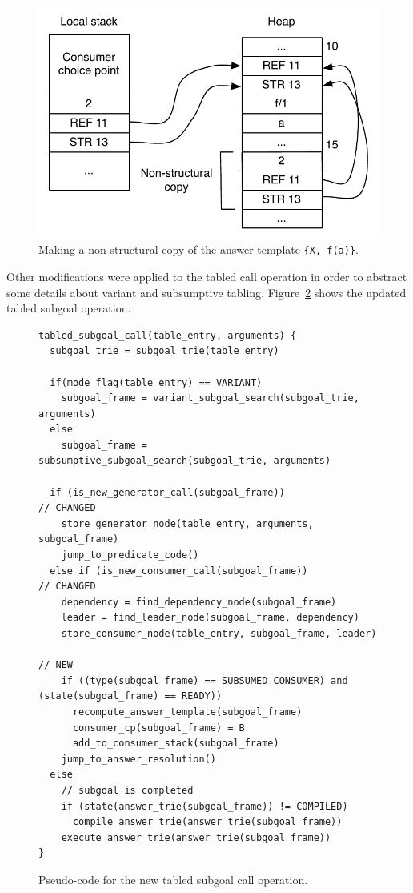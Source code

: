 \begin{figure}[H]
  \centering
    \includegraphics[scale=0.6]{non_structural_copy.pdf}
  \caption{Making a non-structural copy of the answer template \texttt{\{X,~f(a)\}}.}
  \label{fig:non_structural_copy}
\end{figure}

Other modifications were applied to the tabled call operation in order to abstract some details about
variant and subsumptive tabling. Figure~\ref{fig:tabled_subgoal_call_new} shows the updated tabled
subgoal operation.

\begin{figure}[ht]
\begin{Verbatim}
tabled_subgoal_call(table_entry, arguments) {
  subgoal_trie = subgoal_trie(table_entry)
  
  if(mode_flag(table_entry) == VARIANT)
    subgoal_frame = variant_subgoal_search(subgoal_trie, arguments)
  else
    subgoal_frame = subsumptive_subgoal_search(subgoal_trie, arguments)
  
  if (is_new_generator_call(subgoal_frame))                 // CHANGED
    store_generator_node(table_entry, arguments, subgoal_frame)
    jump_to_predicate_code()
  else if (is_new_consumer_call(subgoal_frame))             // CHANGED
    dependency = find_dependency_node(subgoal_frame)
    leader = find_leader_node(subgoal_frame, dependency)
    store_consumer_node(table_entry, subgoal_frame, leader)
                                                            // NEW
    if ((type(subgoal_frame) == SUBSUMED_CONSUMER) and (state(subgoal_frame) == READY))
      recompute_answer_template(subgoal_frame)
      consumer_cp(subgoal_frame) = B
      add_to_consumer_stack(subgoal_frame)
    jump_to_answer_resolution()
  else
    // subgoal is completed
    if (state(answer_trie(subgoal_frame)) != COMPILED)
      compile_answer_trie(answer_trie(subgoal_frame))
    execute_answer_trie(answer_trie(subgoal_frame))
}
\end{Verbatim}
\caption{Pseudo-code for the new tabled subgoal call operation.}
\label{fig:tabled_subgoal_call_new}
\end{figure}

